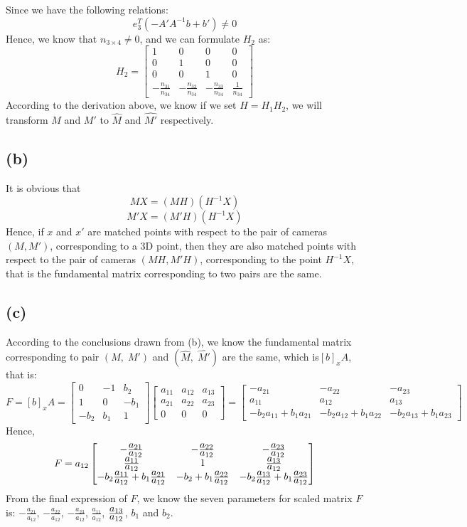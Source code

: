 \documentclass[letterpaper]{article}
\begin{document}
Since we have the following relations:
$$e_{3}^T\left(-A'A^{-1}b + b'\right) \neq 0$$
Hence, we know that $n_{3\times 4} \neq 0$, and we can formulate $H_2$ as:
$$H_2 = 
\begin{bmatrix}
1 & 0 & 0 & 0\\
0 & 1 & 0 & 0\\
0 & 0 & 1 & 0\\
-\tfrac{n_{31}}{n_{34}} & -\tfrac{n_{32}}{n_{34}} & -\tfrac{n_{33}}{n_{34}} & \tfrac{1}{n_{34}}
\end{bmatrix}
$$
According to the derivation above, we know if we set $H = H_1H_2$, we will transform $M$ and $M'$ to $\hat{M}$ and $\hat{M'}$ respectively.

\subsection*{(b)}
It is obvious that
$$MX = \left(MH\right)\left(H^{-1}X\right)$$
$$M'X = \left(M'H\right)\left(H^{-1}X\right)$$
Hence, if $x$ and $x'$ are matched points with respect to the pair of cameras $\left(M, M'\right)$, corresponding to a 3D point, then they are also matched points with respect to the pair of cameras $\left(MH, M'H\right)$, corresponding to the point $H^{-1}X$, that is the fundamental matrix corresponding to two pairs are the same.
\subsection*{(c)}
According to the conclusions drawn from (b), we know the fundamental matrix corresponding to pair $(M,\; M')$ and $(\hat{M},\; \hat{M'})$ are the same, which is$[b]_xA$, that is:
$$F = [b]_xA = 
\begin{bmatrix}
0 & -1 & b_2\\
1 & 0 & -b_1\\
-b_2 & b_1 & 1
\end{bmatrix}
\begin{bmatrix}
a_{11} & a_{12} & a_{13}\\
a_{21} & a_{22} & a_{23}\\
0 & 0 & 0
\end{bmatrix}
= 
\begin{bmatrix}
-a_{21} & -a_{22} & -a_{23}\\
a_{11} & a_{12} & a_{13}\\
-b_2a_{11} + b_1a_{21} & -b_2a_{12} + b_1a_{22} & -b_2a_{13} + b_1a_{23}
\end{bmatrix}
$$
Hence, 
$$F = 
a_{12}
\begin{bmatrix}
-\frac{\displaystyle a_{21}}{\displaystyle a_{12}} & -\frac{\displaystyle a_{22}}{\displaystyle a_{12}} & -\frac{\displaystyle a_{23}}{\displaystyle a_{12}}\\
\frac{\displaystyle a_{11}}{\displaystyle a_{12}} & 1 & \frac{\displaystyle a_{13}}{\displaystyle a_{12}}\\
-b_2\frac{\displaystyle a_{11}}{\displaystyle a_{12}} + b_1\frac{\displaystyle a_{21}}{\displaystyle a_{12}} & -b_2 + b_1\frac{\displaystyle a_{22}}{\displaystyle a_{12}} & -b_2\frac{\displaystyle a_{13}}{\displaystyle a_{12}} + b_1\frac{\displaystyle a_{23}}{\displaystyle a_{12}}
\end{bmatrix}
$$
From the final expression of $F$, we know the seven parameters for scaled matrix $F$ is: $-\tfrac{a_{21}}{a_{12}}$, $-\tfrac{a_{22}}{a_{12}}$, $-\tfrac{a_{23}}{a_{12}}$, $\tfrac{a_{11}}{a_{12}}$, $\frac{\displaystyle a_{13}}{\displaystyle a_{12}}$, $b_1$ and $b_2$.
\end{document}
